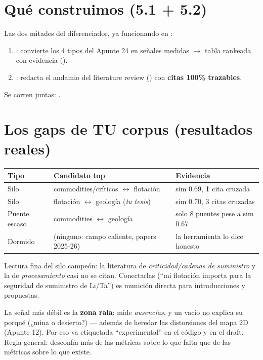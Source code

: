 \documentclass[11pt,a4paper]{article}
\begin{document}

\section{Qué construimos (5.1 + 5.2)}

Las dos mitades del diferenciador, ya funcionando en :
\begin{enumerate}
  \item {}: convierte los 4 tipos del Apunte 24 en señales medidas
        $\rightarrow$ tabla rankeada con evidencia ().
  \item {}: redacta el andamio del literature review
        () con \textbf{citas 100\% trazables}.
\end{enumerate}
Se corren juntas: .

\section{Los gaps de TU corpus (resultados reales)}

\begin{center}
\begin{tabular}{lp{6.2cm}l}
\textbf{Tipo} & \textbf{Candidato top} & \textbf{Evidencia} \\
\hline
Silo & commodities/críticos $\leftrightarrow$ flotación & sim 0.69, \textbf{1} cita cruzada \\
Silo & flotación $\leftrightarrow$ geología (\emph{tu tesis}) & sim 0.70, 3 citas cruzadas \\
Puente escaso & commodities $\leftrightarrow$ geología & solo 8 puentes pese a sim 0.67 \\
Dormido & (ninguno: campo caliente, papers 2025-26) & la herramienta lo dice honesto \\
\end{tabular}
\end{center}

Lectura fina del silo campeón: la literatura de \emph{criticidad/cadenas de suministro} y la
de \emph{procesamiento} casi no se citan. Conectarlas (``mi flotación importa para la
seguridad de suministro de Li/Ta'') es munición directa para introducciones y propuestas.

\begin{ojo}
La señal más débil es la \textbf{zona rala}: mide \emph{ausencias}, y un vacío no explica su
porqué (¿mina o desierto?) — además de heredar las distorsiones del mapa 2D (Apunte 12). Por
eso va etiquetada ``experimental'' en el código y en el draft. Regla general: desconfía más
de las métricas sobre lo que falta que de las métricas sobre lo que existe.
\end{ojo}
\end{document}
